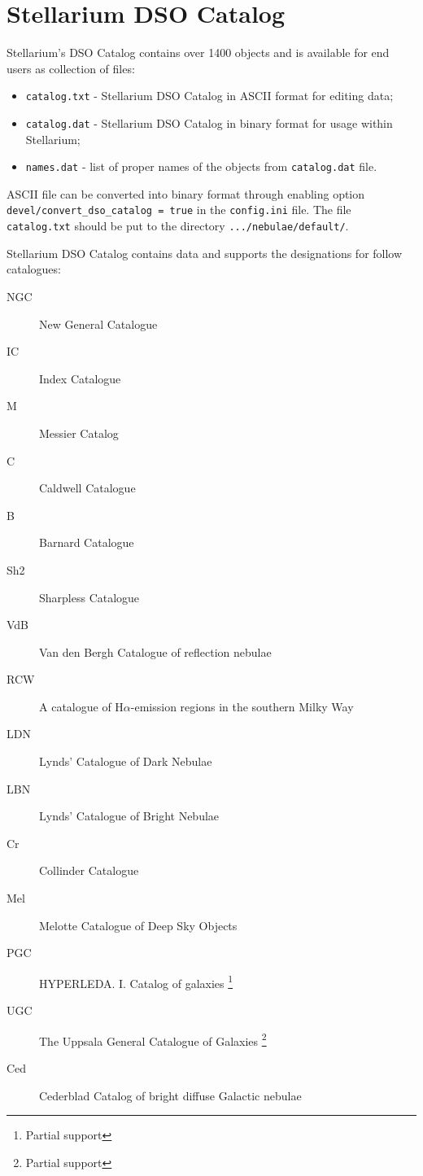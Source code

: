 \section{Stellarium DSO Catalog}%
\label{sec:dso:catalog}

Stellarium's DSO Catalog contains over 1400 objects and is available
for end users as collection of files:

\begin{itemize}
\item
  \texttt{catalog.txt} - Stellarium DSO Catalog in ASCII format for
  editing data;
\item
  \texttt{catalog.dat} - Stellarium DSO Catalog in binary format for
  usage within Stellarium;
\item
  \texttt{names.dat} - list of proper names of the objects from
  \texttt{catalog.dat} file.
\end{itemize}

ASCII file can be converted into binary format through enabling option
\texttt{devel/convert\_dso\_catalog\ =\ true} in the \texttt{config.ini}
file. The file \texttt{catalog.txt} should be put to the directory
\texttt{.../nebulae/default/}.

Stellarium DSO Catalog contains data and supports the designations for
follow catalogues:

\begin{description}
\item[NGC]  New General Catalogue 
\item[IC] Index Catalogue 
\item[M] Messier Catalog
\item[C] Caldwell Catalogue 
\item[B] Barnard Catalogue 
\item[Sh2] Sharpless Catalogue 
\item[VdB] Van den Bergh Catalogue of reflection nebulae 
\item[RCW]  A catalogue of H$\alpha$-emission regions in the southern Milky Way 
\item[LDN]  Lynds' Catalogue of Dark Nebulae 
\item[LBN]  Lynds' Catalogue of Bright Nebulae 
\item[Cr] Collinder Catalogue 
\item[Mel]  Melotte Catalogue of Deep Sky Objects 
\item[PGC]  HYPERLEDA. I. Catalog of galaxies \footnote{Partial support}
\item[UGC]  The Uppsala General Catalogue of Galaxies \footnote{Partial    support}
\item[Ced]  Cederblad Catalog of bright diffuse Galactic nebulae 
\end{description}


